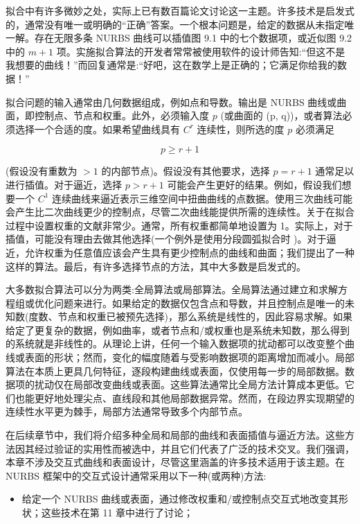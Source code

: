\documentclass[../main.tex]{subfiles}
\begin{document}
拟合中有许多微妙之处，实际上已有数百篇论文讨论这一主题。许多技术是启发式的，通常没有唯一或明确的“正确”答案。一个根本问题是，给定的数据从未指定唯一解。存在无限多条 NURBS 曲线可以插值图 9.1 中的七个数据项，或近似图 9.2 中的 \(m + 1\) 项。实施拟合算法的开发者常常被使用软件的设计师告知:“但这不是我想要的曲线！”而回复通常是:“好吧，这在数学上是正确的；它满足你给我的数据！”

拟合问题的输入通常由几何数据组成，例如点和导数。输出是 NURBS 曲线或曲面，即控制点、节点和权重。此外，必须输入度 \(p\) (或曲面的 (p, q))，或者算法必须选择一个合适的度。如果希望曲线具有 \({C}^{r}\) 连续性，则所选的度 \(p\) 必须满足

\[
p \geq  r + 1 \tag{9.1}
\]



(假设没有重数为 \(> 1\) 的内部节点)。假设没有其他要求，选择 \(p = r + 1\) 通常足以进行插值。对于逼近，选择 \(p > r + 1\) 可能会产生更好的结果。例如，假设我们想要一个 \({C}^{1}\) 连续曲线来逼近表示三维空间中扭曲曲线的点数据。使用三次曲线可能会产生比二次曲线更少的控制点，尽管二次曲线能提供所需的连续性。关于在拟合过程中设置权重的文献非常少。通常，所有权重都简单地设置为 1。实际上，对于插值，可能没有理由去做其他选择(一个例外是使用分段圆弧拟合时 \cite{Hosc92b})。对于逼近，允许权重为任意值应该会产生具有更少控制点的曲线和曲面；我们提出了一种这样的算法。最后，有许多选择节点的方法，其中大多数是启发式的。

大多数拟合算法可以分为两类:全局算法或局部算法。全局算法通过建立和求解方程组或优化问题来进行。如果给定的数据仅包含点和导数，并且控制点是唯一的未知数(度数、节点和权重已被预先选择)，那么系统是线性的，因此容易求解。如果给定了更复杂的数据，例如曲率，或者节点和/或权重也是系统未知数，那么得到的系统就是非线性的。从理论上讲，任何一个输入数据项的扰动都可以改变整个曲线或表面的形状；然而，变化的幅度随着与受影响数据项的距离增加而减小。局部算法在本质上更具几何特征，逐段构建曲线或表面，仅使用每一步的局部数据。数据项的扰动仅在局部改变曲线或表面。这些算法通常比全局方法计算成本更低。它们也能更好地处理尖点、直线段和其他局部数据异常。然而，在段边界实现期望的连续性水平更为棘手，局部方法通常导致多个内部节点。

在后续章节中，我们将介绍多种全局和局部的曲线和表面插值与逼近方法。这些方法因其经过验证的实用性而被选中，并且它们代表了广泛的技术交叉。我们强调，本章不涉及交互式曲线和表面设计，尽管这里涵盖的许多技术适用于该主题。在 NURBS 框架中的交互式设计通常采用以下一种(或两种)方法:

\begin{itemize}
\item 给定一个 NURBS 曲线或表面，通过修改权重和/或控制点交互式地改变其形状；这些技术在第 11 章中进行了讨论；
\end{itemize}
\end{document}
